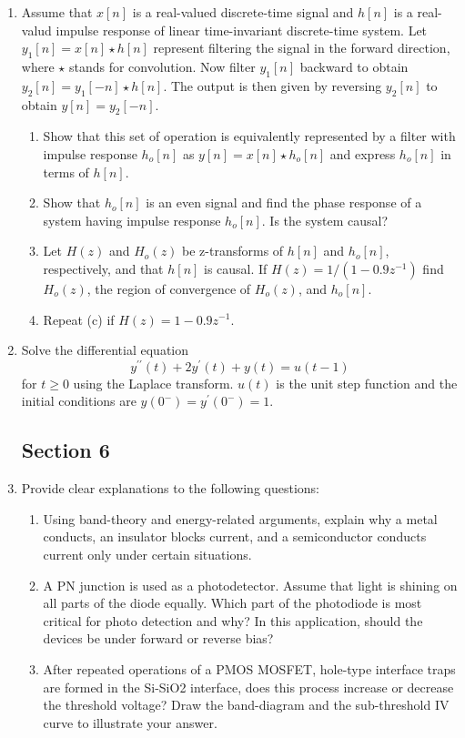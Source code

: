 \documentclass[main.tex]{subfiles}
\begin{document}
\begin{enumerate}
\item Assume that $x[n]$ is a real-valued discrete-time signal and $h[n]$ is a real-valud impulse response of linear time-invariant discrete-time system. Let $y_{1}[n]=x[n] \star h[n]$ represent filtering the signal in the forward direction, where $\star$ stands for convolution. Now filter $y_{1}[n]$ backward to obtain $y_{2}[n]=y_{1}[-n] \star h[n]$. The output is then given by reversing $y_{2}[n]$ to obtain $y[n]=y_{2}[-n]$.

    \begin{enumerate}
        \item Show that this set of operation is equivalently represented by a filter with impulse response $h_{o}[n]$ as $y[n]=x[n] \star h_{o}[n]$ and express $h_{o}[n]$ in terms of $h[n]$.
        \item Show that $h_{o}[n]$ is an even signal and find the phase response of a system having impulse response $h_{o}[n]$. Is the system causal?
        \item Let $H(z)$ and $H_{o}(z)$ be z-transforms of $h[n]$ and $h_{o}[n]$, respectively, and that $h[n]$ is causal. If $H(z)=1 /\left(1-0.9 z^{-1}\right)$ find $H_{o}(z)$, the region of convergence of $H_{o}(z)$, and $h_{o}[n]$.
        \item Repeat (c) if $H(z)=1-0.9 z^{-1}$.
    \end{enumerate}
    
\item Solve the differential equation
    $$y^{\prime \prime}(t)+2 y^{\prime}(t)+y(t)=u(t-1)$$
for $t \geq 0$ using the Laplace transform. $u(t)$ is the unit step function and the initial conditions are $y\left(0^{-}\right)=y^{\prime}\left(0^{-}\right)=1$.

\subsection{Section 6}

\item Provide clear explanations to the following questions:

    \begin{enumerate}
        \item Using band-theory and energy-related arguments, explain why a metal conducts, an insulator blocks current, and a semiconductor conducts current only under certain situations.
        \item A PN junction is used as a photodetector. Assume that light is shining on all parts of the diode equally. Which part of the photodiode is most critical for photo detection and why? In this application, should the devices be under forward or reverse bias?
        \item After repeated operations of a PMOS MOSFET, hole-type interface traps are formed in the Si-SiO2 interface, does this process increase or decrease the threshold voltage? Draw the band-diagram and the sub-threshold IV curve to illustrate your answer.
    \end{enumerate}


\end{enumerate}
\end{document}
